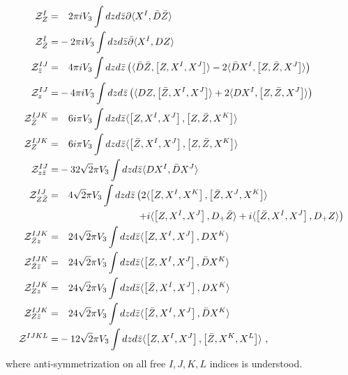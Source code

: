 \documentclass[12pt]{article}
\newcommand{\nn}{\nonumber}
\numberwithin{equation}{section}
\begin{document}
\begin{align}
{\cal Z}_Z^I =& \quad {2\pi} i V_3 \int dzd\bar z\partial \langle X^I, \bar{D} \bar{Z} \rangle \nn \\
{\cal Z}_{\bar{Z}}^I  =& -2\pi i V_3 \int dz d\bar{z} \bar\partial \langle X^I, D Z  \rangle \nn \\
{\cal Z}_{\bar{z}}^{IJ} =& \quad 4 \pi i V_3 \int dz d\bar{z} \left( \langle  \bar{D}\bar{Z}  ,\left[ Z, X^I, X^J \right]  \rangle - 2 \langle \bar{D} X^I, \left[ Z, \bar{Z}, X^J \right]  \rangle \right) \nn \\
{\cal Z}_z^{IJ} =& -4 \pi i V_3 \int dz d\bar{z} \left( \langle D Z  ,\left[ \bar{Z}, X^I, X^J \right]  \rangle + 2 \langle D X^I, \left[ Z, \bar{Z}, X^J \right]  \rangle \right) \nn \\
{\cal Z}_{\bar{Z}}^{IJK} =& \quad 6 i \pi V_3 \int dz d\bar{z} \langle \left[Z, X^I, X^J \right], \left[Z, \bar{Z}, X^K \right] \rangle \nn \\
{\cal Z}_{Z}^{IJK} =& \quad 6 i \pi V_3 \int dz d\bar{z} \langle \left[\bar{Z}, X^I, X^J \right], \left[Z, \bar{Z}, X^K \right] \rangle \nn \\ \nn  
{\cal Z}_{z\bar{z}}^{IJ} =& -32 \sqrt{2} \pi V_3 \int dz d \bar{z} \langle D X^I, \bar{D} X^J \rangle \nn \\
{\cal Z}_{Z \bar{Z}}^{IJ} =& \quad 4 \sqrt{2} \pi V_3  \int dz d\bar{z} \left( 2\langle \left[ Z, X^I, X^K \right], \left[ \bar{Z}, X^J, X^K \right]  \rangle\right.\nn \\ &
\qquad\qquad\qquad \qquad   \left.+ i \langle \left[ Z, X^I, X^J  \right], D_+ \bar{Z} \rangle + i \langle \left[\bar{Z}, X^I, X^J \right], D_+ Z \rangle    \right) \nn \\
{\cal Z}_{\bar{Z}z}^{IJK} =& \quad 24 \sqrt{2} \pi V_3 \int dz d\bar{z} \langle \left[ Z, X^I, X^J \right], DX^K \rangle \nn \\
{\cal Z}_{\bar{Z}\bar{z}}^{IJK} =& \quad 24 \sqrt{2} \pi V_3 \int dz d\bar{z} \langle \left[ Z, X^I, X^J \right], \bar{D} X^K \rangle \nn \\
{\cal Z}_{Zz}^{IJK} =& \quad 24 \sqrt{2} \pi V_3  \int dz d\bar{z} \langle \left[ \bar{Z}, X^I, X^J \right], D X^K \rangle \nn \\
{\cal Z}_{Z\bar{z}}^{IJK} =& \quad 24 \sqrt{2} \pi V_3 \int dz d\bar{z} \langle \left[ \bar{Z}, X^I, X^J \right], \bar{D} X^K \rangle \nn \\
{\cal Z}^{IJKL} =& - 12 \sqrt{2}\pi V_3 \int dz d \bar{z} \langle \left[ Z, X^I, X^J  \right], \left[ \bar{Z}, X^K, X^L \right] \rangle \ ,
\end{align}
where anti-symmetrization on all free $I,J,K,L$ indices is understood.
\end{document}

